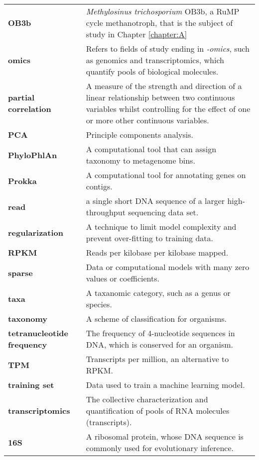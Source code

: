 \begin{singlespace}
\begin{longtable}{ p{}  p{} }
\textbf{OB3b} & \textit{Methylosinus trichosporium} {OB3b}, a RuMP cycle methanotroph, that is the subject of study in Chapter \ref{chapter:A}  \\
\textbf{omics} & Refers to fields of study ending in \textit{-omics}, such as genomics and transcriptomics, which quantify pools of biological molecules. \\
\textbf{partial correlation} & A measure of the strength and direction of a linear relationship between two continuous variables whilst controlling for the effect of one or more other continuous variables. \\
\textbf{PCA} & Principle components analysis. \\
\textbf{PhyloPhlAn} & A computational tool that can assign taxonomy to metagenome bins. \\
\textbf{Prokka} & A computational tool for annotating genes on contigs. \\
\textbf{read} & a single short DNA sequence of a larger high-throughput sequencing data set. \\
\textbf{regularization} & A technique to limit model complexity and prevent over-fitting to training data. \\
\textbf{RPKM} & Reads per kilobase per kilobase mapped. \\ %
\textbf{sparse} & Data or computational models with many zero values or coefficients. \\
\textbf{taxa} & A taxanomic category, such as a genus or species. \\
\textbf{taxonomy} & A scheme of classification for organisms. \\
\textbf{tetranucleotide frequency} & The frequency of 4-nucleotide sequences in DNA, which is conserved for an organism. \\
\textbf{TPM} & %
	Transcripts per million, an alternative to RPKM. \\
\textbf{training set} &  Data used to train a machine learning model. \\
\textbf{transcriptomics} & The collective characterization and quantification of pools of RNA molecules (transcripts). \\
\textbf{16S} & A ribosomal protein, whose DNA sequence is commonly used for evolutionary inference. \\

\end{longtable}
\end{singlespace}
